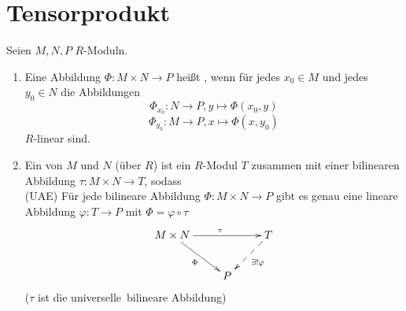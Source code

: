 \documentclass[a4paper, 10pt]{report}
\begin{document}
\section{Tensorprodukt}

\begin{Def}
  Seien $M, N, P$ $R$-Moduln.

  \begin{enumerate}
    \item Eine Abbildung $\Phi: M \times N \to P$ heißt
          , wenn für jedes $x_0 \in M$ und
          jedes $y_0 \in N$ die Abbildungen 
          \[\Phi_{x_0}: N \to P, y \mapsto \Phi(x_0,y)\]
          \[\Phi_{y_0}: M \to P, x \mapsto \Phi(x,y_0)\] $R$-linear sind.
    \item Ein  von $M$ und $N$ (über $R$)
          ist ein $R$-Modul $T$ zusammen mit einer bilinearen Abbildung $\tau: M
          \times N \to T$, sodass\\
          (UAE) Für jede bilineare Abbildung $\Phi: M \times N \to P$ gibt es
          genau eine lineare Abbildung $\varphi: T \to P$ mit $\Phi = \varphi \circ
          \tau$
          \[
            \begin{xy}
              \xymatrix{
                M \times N \ar[rr]^{\tau} \ar[rd]_{\Phi}  &     &  T \ar@{-->}[dl]^{\exists!\varphi}  \\
                                                          &  P  &
              }
            \end{xy}
          \]
          ($\tau$ ist die \glqq universelle\grqq\ bilineare Abbildung)
  \end{enumerate}
\end{Def}
\end{document}
